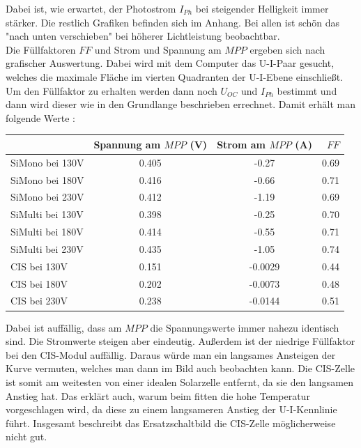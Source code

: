 Dabei ist, wie erwartet, der Photostrom $I_{Ph}$ bei steigender Helligkeit immer stärker. Die restlich Grafiken befinden sich im Anhang. Bei 
allen ist schön das "nach unten verschieben" bei höherer Lichtleistung beobachtbar. \\
Die Füllfaktoren $FF$ und Strom und Spannung am $MPP$ ergeben sich nach grafischer Auswertung. Dabei wird mit dem Computer das U-I-Paar gesucht, welches die maximale Fläche 
im vierten Quadranten der U-I-Ebene einschließt. Um den Füllfaktor zu erhalten werden dann noch $U_{OC}$ und $I_{Ph}$ bestimmt und dann wird dieser wie in den Grundlange 
beschrieben errechnet. Damit erhält man folgende Werte :\\
\begin{table}[h]
    \centering
    \begin{tabular}{l|c|c|r}
        & Spannung am $MPP$ (V) & Strom am $MPP$ (A) & $FF$ \\
        \toprule
        SiMono bei 130V & 0.405 & -0.27 & 0.69 \\
        SiMono bei 180V & 0.416 &-0.66 & 0.71 \\
        SiMono bei 230V & 0.412 & -1.19 & 0.69\\
        \midrule
        SiMulti bei 130V & 0.398 & -0.25 & 0.70 \\
        SiMulti bei 180V & 0.414 & -0.55 & 0.71 \\
        SiMulti bei 230V & 0.435 & -1.05 & 0.74\\
        \midrule
        CIS bei 130V & 0.151 &  -0.0029 & 0.44 \\
        CIS bei 180V & 0.202 & -0.0073 & 0.48 \\
        CIS bei 230V & 0.238 & -0.0144 & 0.51\\
    \end{tabular}
\end{table}

Dabei ist auffällig, dass am $MPP$ die Spannungswerte immer nahezu identisch sind. Die Stromwerte steigen aber eindeutig. Außerdem ist der 
niedrige Füllfaktor bei den CIS-Modul auffällig. Daraus würde man ein langsames Ansteigen der Kurve vermuten, welches man dann im Bild auch beobachten kann. 
Die CIS-Zelle ist somit am weitesten von einer idealen Solarzelle entfernt, da sie den langsamen Anstieg hat. Das erklärt auch, warum beim fitten die 
hohe Temperatur vorgeschlagen wird, da diese zu einem langsameren Anstieg der U-I-Kennlinie führt. Insgesamt beschreibt das Ersatzschaltbild 
die CIS-Zelle möglicherweise nicht gut.

